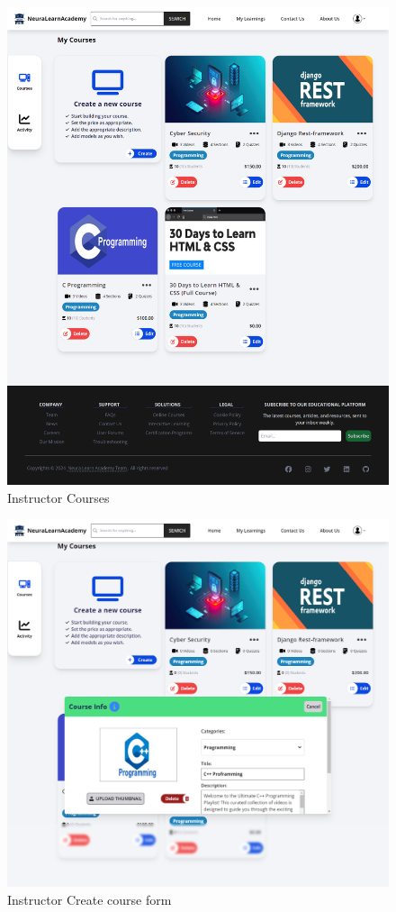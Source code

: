 \begin{figure}[h!]
	\centering
	\includegraphics[max height=\textheight,max width=\textwidth]{figures/frontend/instructor courses page.png}
	\caption{Instructor Courses}
\end{figure}

\begin{figure}[h!]
	\centering
	\includegraphics[max height=\textheight,max width=\textwidth]{figures/frontend/createcourse.png}
	\caption{Instructor Create course form}
\end{figure}

